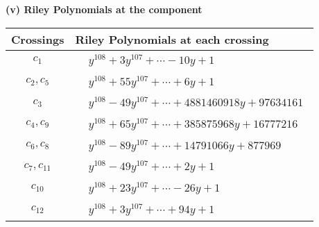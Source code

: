 \documentclass[1p]{elsarticle_modified}
\theoremstyle{definition}
\begin{document}
\newpage\renewcommand{\arraystretch}{1}
\flushleft \textbf{(v) Riley Polynomials at the component}\newline \\
\begin{tabular}{m{50pt}|m{274pt}}
Crossings & \hspace{64pt}Riley Polynomials at each crossing \\
\hline $$\begin{aligned}c_{1}\end{aligned}$$&$\begin{aligned}
&y^{108}+3 y^{107}+\cdots-10 y+1
\end{aligned}$\\
\hline $$\begin{aligned}c_{2},c_{5}\end{aligned}$$&$\begin{aligned}
&y^{108}+55 y^{107}+\cdots+6 y+1
\end{aligned}$\\
\hline $$\begin{aligned}c_{3}\end{aligned}$$&$\begin{aligned}
&y^{108}-49 y^{107}+\cdots+4881460918 y+97634161
\end{aligned}$\\
\hline $$\begin{aligned}c_{4},c_{9}\end{aligned}$$&$\begin{aligned}
&y^{108}+65 y^{107}+\cdots+385875968 y+16777216
\end{aligned}$\\
\hline $$\begin{aligned}c_{6},c_{8}\end{aligned}$$&$\begin{aligned}
&y^{108}-89 y^{107}+\cdots+14791066 y+877969
\end{aligned}$\\
\hline $$\begin{aligned}c_{7},c_{11}\end{aligned}$$&$\begin{aligned}
&y^{108}-49 y^{107}+\cdots+2 y+1
\end{aligned}$\\
\hline $$\begin{aligned}c_{10}\end{aligned}$$&$\begin{aligned}
&y^{108}+23 y^{107}+\cdots-26 y+1
\end{aligned}$\\
\hline $$\begin{aligned}c_{12}\end{aligned}$$&$\begin{aligned}
&y^{108}+3 y^{107}+\cdots+94 y+1
\end{aligned}$\\
\hline
\end{tabular}\\~\\
\end{document}
